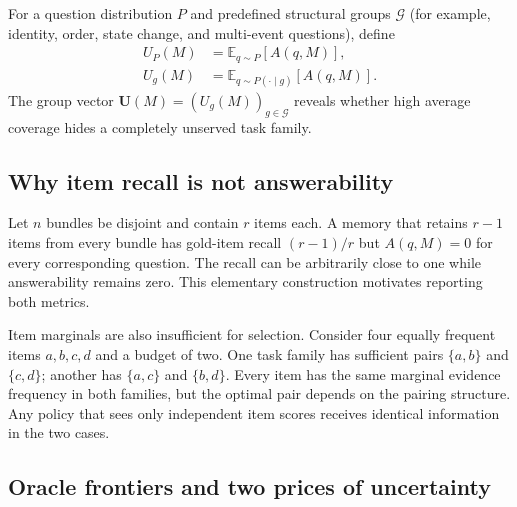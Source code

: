 \documentclass[10pt,twocolumn,letterpaper]{article}
\begin{document}
For a question distribution $P$ and predefined structural groups $\mathcal G$ (for example, identity, order, state change, and multi-event questions), define
\begin{align}
    U_P(M)&=\mathbb E_{q\sim P}[A(q,M)],\\
    U_g(M)&=\mathbb E_{q\sim P(\cdot\mid g)}[A(q,M)].
    \label{eq:utility}
\end{align}
The group vector $\mathbf U(M)=(U_g(M))_{g\in\mathcal G}$ reveals whether high average coverage hides a completely unserved task family.

\subsection{Why item recall is not answerability}

Let $n$ bundles be disjoint and contain $r$ items each.
A memory that retains $r-1$ items from every bundle has gold-item recall $(r-1)/r$ but $A(q,M)=0$ for every corresponding question.
The recall can be arbitrarily close to one while answerability remains zero.
This elementary construction motivates reporting both metrics.

Item marginals are also insufficient for selection.
Consider four equally frequent items $a,b,c,d$ and a budget of two.
One task family has sufficient pairs $\{a,b\}$ and $\{c,d\}$; another has $\{a,c\}$ and $\{b,d\}$.
Every item has the same marginal evidence frequency in both families, but the optimal pair depends on the pairing structure.
Any policy that sees only independent item scores receives identical information in the two cases.

\subsection{Oracle frontiers and two prices of uncertainty}
\end{document}

